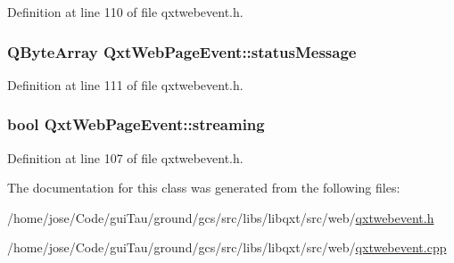 Definition at line 110 of file qxtwebevent.\-h.

\hypertarget{class_qxt_web_page_event_a4462b06516d2a680530b57dd37610da6}{
\subsubsection[{status\-Message}]{\setlength{\rightskip}{0pt plus 5cm}Q\-Byte\-Array Qxt\-Web\-Page\-Event\-::status\-Message}}\label{class_qxt_web_page_event_a4462b06516d2a680530b57dd37610da6}


Definition at line 111 of file qxtwebevent.\-h.

\hypertarget{class_qxt_web_page_event_a7e523943475e8db70ddadc3b6303fe34}{
\subsubsection[{streaming}]{\setlength{\rightskip}{0pt plus 5cm}bool Qxt\-Web\-Page\-Event\-::streaming}}\label{class_qxt_web_page_event_a7e523943475e8db70ddadc3b6303fe34}


Definition at line 107 of file qxtwebevent.\-h.



The documentation for this class was generated from the following files\-:\begin{DoxyCompactItemize}
\item 
/home/jose/\-Code/gui\-Tau/ground/gcs/src/libs/libqxt/src/web/\hyperlink{qxtwebevent_8h}{qxtwebevent.\-h}\item 
/home/jose/\-Code/gui\-Tau/ground/gcs/src/libs/libqxt/src/web/\hyperlink{qxtwebevent_8cpp}{qxtwebevent.\-cpp}\end{DoxyCompactItemize}
